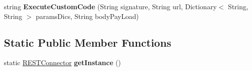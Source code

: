 \begin{DoxyCompactItemize}
\item 
\hypertarget{classcom_1_1shephertz_1_1app42_1_1paas_1_1sdk_1_1csharp_1_1connection_1_1_r_e_s_t_connector_a87aa97daf2f97ea8743b8c32db29c1dd}{string {\bfseries Execute\+Custom\+Code} (String signature, String url, Dictionary$<$ String, String $>$ params\+Dics, String body\+Pay\+Load)}\label{classcom_1_1shephertz_1_1app42_1_1paas_1_1sdk_1_1csharp_1_1connection_1_1_r_e_s_t_connector_a87aa97daf2f97ea8743b8c32db29c1dd}

\end{DoxyCompactItemize}
\subsection*{Static Public Member Functions}
\begin{DoxyCompactItemize}
\item 
\hypertarget{classcom_1_1shephertz_1_1app42_1_1paas_1_1sdk_1_1csharp_1_1connection_1_1_r_e_s_t_connector_a99ef55c896dde3f812fb99d9228a01cf}{static \hyperlink{classcom_1_1shephertz_1_1app42_1_1paas_1_1sdk_1_1csharp_1_1connection_1_1_r_e_s_t_connector}{R\+E\+S\+T\+Connector} {\bfseries get\+Instance} ()}\label{classcom_1_1shephertz_1_1app42_1_1paas_1_1sdk_1_1csharp_1_1connection_1_1_r_e_s_t_connector_a99ef55c896dde3f812fb99d9228a01cf}

\end{DoxyCompactItemize}
